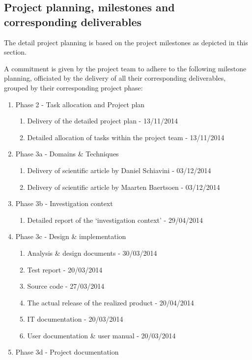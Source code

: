 \subsection{Project planning, milestones and corresponding deliverables }
The detail project planning is based on the project milestones as depicted in this section.

A commitment is given by the project team to adhere to the following milestone planning, officiated by the delivery of all their corresponding deliverables, grouped by their corresponding project phase:

 \begin{enumerate}
	\item Phase 2 - Task allocation and Project plan
 	\begin{enumerate}
		\item Delivery of the detailed project plan 			-	13/11/2014
		\item Detailed allocation of tasks within the project team 	- 	13/11/2014
	\end {enumerate}
	\item Phase 3a - Domains \& Techniques
 	\begin{enumerate}
		\item Delivery of scientific article by Daniel Schiavini		- 	03/12/2014
		\item Delivery of scientific article by Maarten Baertsoen		- 	03/12/2014
	\end {enumerate}
 	\item Phase 3b - Investigation context
 	\begin{enumerate}
		\item Detailed report of the `investigation context'  		- 	29/04/2014
	\end {enumerate}
 	\item Phase 3c - Design \& implementation
 	\begin{enumerate}
		\item Analysis \& design documents  				- 	30/03/2014
		\item Test report  							- 	20/03/2014
		\item Source code  							- 	27/03/2014
		\item The actual release of the realized product  		- 	20/04/2014
		\item IT documentation  						- 	20/03/2014
		\item User documentation \& user manual  			- 	20/03/2014
	\end {enumerate}
 	\item Phase 3d - Project documentation

\end{enumerate}
